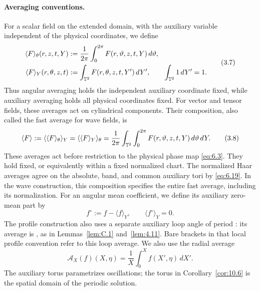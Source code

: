 \paragraph{Averaging conventions.}
For a scalar field  on the extended domain, with the
auxiliary variable  independent of the physical coordinates, we define
\begin{equation}
\begin{aligned}
\langle F\rangle_\theta(r,z,t,Y)
  &:=\frac1{2\pi}\int_0^{2\pi}F(r,\vartheta,z,t,Y)\,d\vartheta,\\
\langle F\rangle_Y(r,\theta,z,t)
  &:=\int_{\mathbb{T}^2}F(r,\theta,z,t,Y')\,dY',
  \qquad \int_{\mathbb{T}^2}1\,dY'=1.
\end{aligned}
\tag{3.7}\label{eq:3.7}
\end{equation}
Thus angular averaging holds the independent auxiliary coordinate fixed, while auxiliary
averaging holds all physical coordinates fixed. For vector and tensor fields, these averages
act on cylindrical components. Their composition, also called the fast average for wave fields,
is
\begin{equation}
\langle F\rangle
:=\langle\langle F\rangle_\theta\rangle_Y
=\langle\langle F\rangle_Y\rangle_\theta
=\frac1{2\pi}\int_{\mathbb{T}^2}\int_0^{2\pi}F(r,\vartheta,z,t,Y)\,d\vartheta\,dY.
\tag{3.8}\label{eq:3.8}
\end{equation}
These averages act before restriction to the physical phase map \eqref{eq:6.3}. They hold
 fixed,
or equivalently  within a fixed normalized chart. The normalized Haar averages
agree on the absolute, band, and common auxiliary tori by \eqref{eq:6.19}. In the wave construction,
this composition specifies the entire fast average, including its normalization. For an angular
mean coefficient, we define its auxiliary zero-mean part by
\begin{equation}
f^\circ:=f-\langle f\rangle_Y,
\qquad
\langle f^\circ\rangle_Y=0.
\tag{3.9}\label{eq:3.9}
\end{equation}
The profile construction also uses a separate auxiliary loop angle
 of period : its average
is , as in Lemmas~\ref{lem:C.1} and~\ref{lem:4.11}. Bare brackets in that local profile
convention refer to this loop average. We also use the radial average
\begin{equation}
\mathcal A_X(f)(X,\eta)=\frac1X\int_0^X f(X',\eta)\,dX'.
\tag{3.10}\label{eq:3.10}
\end{equation}
The auxiliary torus parametrizes oscillations; the torus in Corollary~\ref{cor:10.6} is the spatial domain
of the periodic solution.

